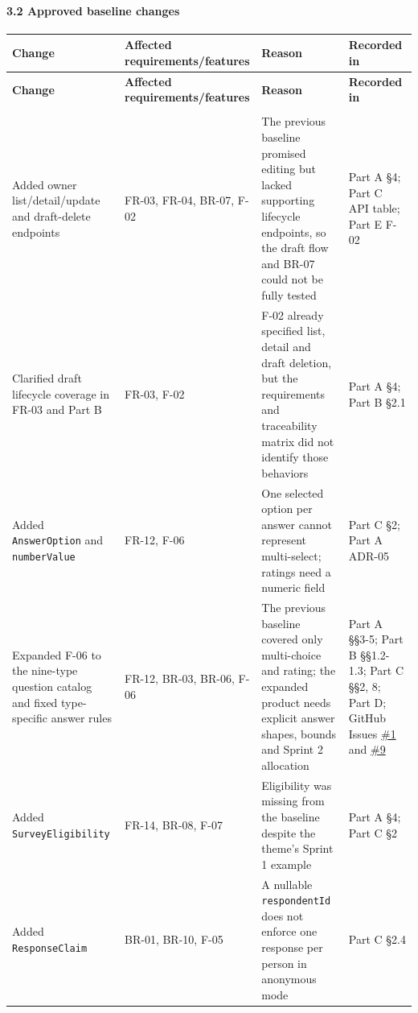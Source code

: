 \documentclass[12pt,a4paper]{article}
\begin{document}
\paragraph*{3.2 Approved baseline changes}
{\setlength{\tabcolsep}{3pt}\renewcommand{\arraystretch}{1.08}\small
\begin{longtable}{@{}>{\raggedright\arraybackslash}p{}>{\raggedright\arraybackslash}p{}>{\raggedright\arraybackslash}p{}>{\raggedright\arraybackslash}p{}@{}}
\toprule
\textbf{Change} & \textbf{Affected requirements/features} & \textbf{Reason} & \textbf{Recorded in} \\
\midrule
\endfirsthead
\toprule
\textbf{Change} & \textbf{Affected requirements/features} & \textbf{Reason} & \textbf{Recorded in} \\
\midrule
\endhead
\midrule
\multicolumn{4}{r}{\footnotesize\textit{Continued on next page}}\\
\endfoot
\bottomrule
\endlastfoot
Added owner list/detail/update and draft-delete endpoints & FR-03, FR-04, BR-07, F-02 & The previous baseline promised editing but lacked supporting lifecycle endpoints, so the draft flow and BR-07 could not be fully tested & Part A \S{}4; Part C API table; Part E F-02 \\
Clarified draft lifecycle coverage in FR-03 and Part B & FR-03, F-02 & F-02 already specified list, detail and draft deletion, but the requirements and traceability matrix did not identify those behaviors & Part A \S{}4; Part B \S{}2.1 \\
Added \texttt{AnswerOption} and \texttt{numberValue} & FR-12, F-06 & One selected option per answer cannot represent multi-select; ratings need a numeric field & Part C \S{}2; Part A ADR-05 \\
Expanded F-06 to the nine-type question catalog and fixed type-specific answer rules & FR-12, BR-03, BR-06, F-06 & The previous baseline covered only multi-choice and rating; the expanded product needs explicit answer shapes, bounds and Sprint 2 allocation & Part A \S{}\S{}3-5; Part B \S{}\S{}1.2-1.3; Part C \S{}\S{}2, 8; Part D; GitHub Issues \href{https://github.com/Snnn3/SurveyHub/issues/1}{\#1} and \href{https://github.com/Snnn3/SurveyHub/issues/9}{\#9} \\
Added \texttt{SurveyEligibility} & FR-14, BR-08, F-07 & Eligibility was missing from the baseline despite the theme's Sprint 1 example & Part A \S{}4; Part C \S{}2 \\
Added \texttt{ResponseClaim} & BR-01, BR-10, F-05 & A nullable \texttt{respondentId} does not enforce one response per person in anonymous mode & Part C \S{}2.4 \\

\end{longtable}}
\end{document}
